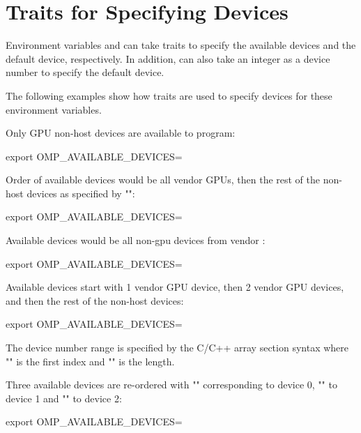 \pagebreak
\section{Traits for Specifying Devices}
\label{sec:device_env_traits}


Environment variables  and
 can take traits to specify the available
devices and the default device, respectively.
In addition,  can also take an integer
as a device number to specify the default device.

The following examples show how traits are used to specify devices
for these environment variables.

Only GPU non-host devices are available to program:
\begin{boxedcode}
export OMP_AVAILABLE_DEVICES= 
\end{boxedcode}

Order of available devices would be all vendor  GPUs, then 
the rest of the non-host devices as specified by "\ucode{*}":
\begin{boxedcode}
export OMP_AVAILABLE_DEVICES=
\end{boxedcode}

Available devices would be all non-gpu devices from vendor :
\begin{boxedcode}
export OMP_AVAILABLE_DEVICES=
\end{boxedcode}

Available devices start with 1 vendor  GPU device, then 
2 vendor  GPU devices, and then the rest of the non-host devices:
\begin{boxedcode}
export OMP_AVAILABLE_DEVICES=
\end{boxedcode}
The device number range is specified by the C/C++ array section syntax
\ucode{[0:2]} where "" is the first index and ""
is the length.

Three available devices are re-ordered with "" corresponding 
to device 0, "" to device 1 and ""
to device 2:
\begin{boxedcode}
export OMP_AVAILABLE_DEVICES=
\end{boxedcode}

